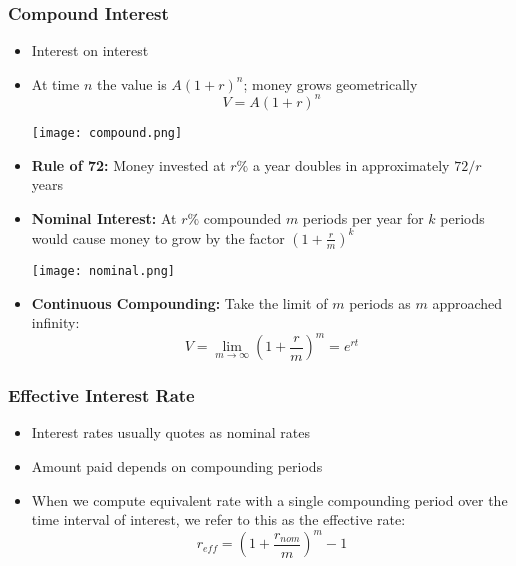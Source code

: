 \documentclass[11pt]{article}
\begin{document}
\subsubsection{Compound Interest}
\begin{itemize}
\item Interest on interest
\item At time $n$ the value is $A(1+r)^n$; money grows geometrically
$$ V = A(1+r)^n$$
\begin{center}
\texttt{[image: compound.png]} 
\end{center}
\item \textbf{Rule of 72:} Money invested at $r \%$ a year doubles in approximately $72/r$ years
\item \textbf{Nominal Interest:} At $r\%$ compounded $m$ periods per year for $k$ periods would cause money to grow by the factor $(1+ \frac{r}{m})^k$
\begin{center}
\texttt{[image: nominal.png]} 
\end{center}
\item \textbf{Continuous Compounding:} Take the limit of $m$ periods as $m$ approached infinity:
$$V =  \lim_{m \rightarrow \infty} \left(1 +\frac{r}{m} \right)^m = e^{rt}$$
\end{itemize}

\subsubsection{Effective Interest Rate}
\begin{itemize}
\item Interest rates usually quotes as nominal rates
\item Amount paid depends on compounding periods
\item When we compute equivalent rate with a single compounding period over the time interval of interest, we refer to this as the effective rate:
$$ r_{eff} = \left( 1 + \frac{r_{nom}}{m} \right) ^ m -1 $$
\end{itemize}
\end{document}
